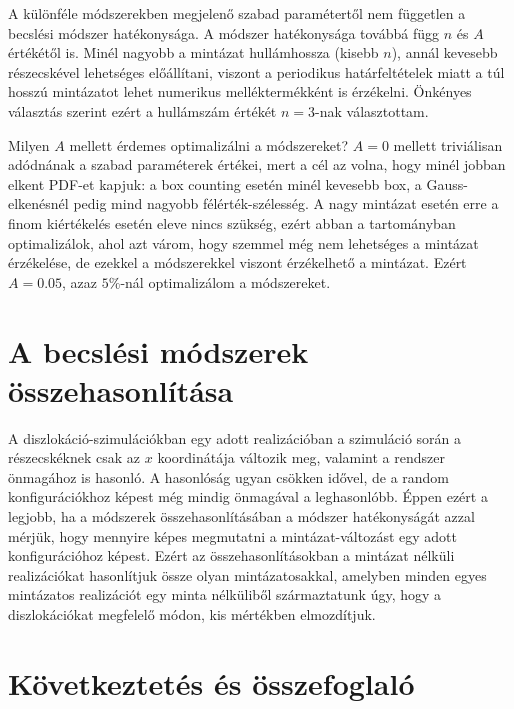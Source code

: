 \documentclass[10pt,a4paper]{scrartcl}
\begin{document}
A különféle módszerekben megjelenő szabad paramétertől nem független a becslési módszer hatékonysága. A módszer hatékonysága továbbá függ $n$ és $A$ értékétől is. Minél nagyobb a mintázat hullámhossza (kisebb $n$), annál kevesebb részecskével lehetséges előállítani, viszont a periodikus határfeltételek miatt a túl hosszú mintázatot lehet numerikus melléktermékként is érzékelni. Önkényes választás szerint ezért a hullámszám értékét $n=3$-nak választottam.

Milyen $A$ mellett érdemes optimalizálni a módszereket? $A=0$ mellett triviálisan adódnának a szabad paraméterek értékei, mert a cél az volna, hogy minél jobban elkent PDF-et kapjuk: a box counting esetén minél kevesebb box, a Gauss-elkenésnél pedig mind nagyobb félérték-szélesség. A nagy mintázat esetén erre a finom kiértékelés esetén eleve nincs szükség, ezért abban a tartományban optimalizálok, ahol azt várom, hogy szemmel még nem lehetséges a mintázat érzékelése, de ezekkel a módszerekkel viszont érzékelhető a mintázat. Ezért $A=0.05$, azaz $5\%$-nál optimalizálom a módszereket.

\section{A becslési módszerek összehasonlítása}
A diszlokáció-szimulációkban egy adott realizációban a szimuláció során a részecskéknek csak az $x$ koordinátája változik meg, valamint a rendszer önmagához is hasonló. A hasonlóság ugyan csökken idővel, de a random konfigurációkhoz képest még mindig önmagával a leghasonlóbb. Éppen ezért a legjobb, ha a módszerek összehasonlításában a módszer hatékonyságát azzal mérjük, hogy mennyire képes megmutatni a mintázat-változást egy adott konfigurációhoz képest. Ezért az összehasonlításokban a mintázat nélküli realizációkat hasonlítjuk össze olyan mintázatosakkal, amelyben minden egyes mintázatos realizációt egy minta nélküliből származtatunk úgy, hogy a diszlokációkat megfelelő módon, kis mértékben elmozdítjuk.


\section{Következtetés és összefoglaló}
\end{document}
